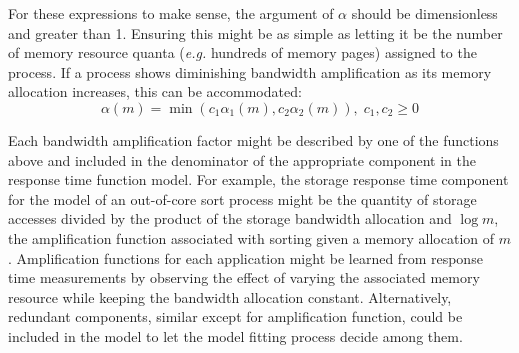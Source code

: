 For these expressions to make sense, the argument of $\alpha$ should be dimensionless and greater than 1.
Ensuring this might be as simple as letting it be the number of memory resource quanta
(\emph{e.g.} hundreds of memory pages) assigned to the process.
If a process shows diminishing bandwidth amplification as its memory allocation increases, this can be accommodated:
\begin{displaymath}
\alpha(m) = \min(c_1\alpha_1(m),c_2\alpha_2(m)),\;c_1,c_2 \geq 0
\end{displaymath}

Each bandwidth amplification factor might be described by one of the functions above
and included in the denominator of the appropriate component in the response time function model.
For example, the storage response time component for the model of an out-of-core sort process might be
the quantity of storage accesses divided by the product of the storage bandwidth allocation and $\log m$,
the amplification function associated with sorting given a memory allocation of $m$.
Amplification functions for each application might be learned from response time measurements
by observing the effect of varying the associated memory resource while keeping the bandwidth allocation constant.
Alternatively, redundant components, similar except for amplification function, could be included in the model
to let the model fitting process decide among them.



